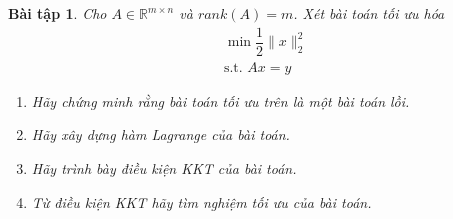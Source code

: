 \documentclass[14pt, a4paper]{article}
\theoremstyle{sltheorem}
\newtheorem{baitap}{Bài tập}
\theoremstyle{soltheorem}
\begin{document}
\begin{titlepage}





        \vfill %

    \end{titlepage}

    \nocite{*}

    \newpage

    \begin{baitap}
        Cho $A \in \mathbb{R}^{m\times n}$ và $rank(A)=m$. Xét bài toán tối ưu hóa
        \begin{equation*}
            \begin{aligned}
                &\min \dfrac{1}{2} \lVert x \rVert_2^2 \\ &\text{s.t. }Ax=y
            \end{aligned}
        \end{equation*}
        \begin{enumerate}[wide, labelwidth=!, labelindent=0pt,label=\textbf{\arabic*}.]
            \item Hãy chứng minh rằng bài toán tối ưu trên là một bài toán lồi.
            \item Hãy xây dựng hàm Lagrange của bài toán.
            \item Hãy trình bày điều kiện KKT của bài toán.
            \item Từ điều kiện KKT hãy tìm nghiệm tối ưu của bài toán.
        \end{enumerate}
    \end{baitap}
\end{document}
